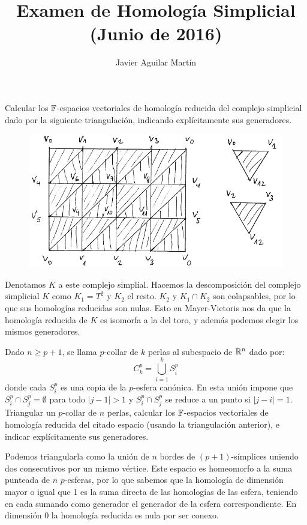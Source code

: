 \documentclass[twoside]{article}
\begin{document}
\title{Examen de Homología Simplicial (Junio de 2016)}
\author{Javier Aguilar Martín}
\maketitle

\begin{ejercicio}{1}
Calcular los $\mathbb{F}$-espacios vectoriales de homología reducida del complejo simplicial dado por la siguiente triangulación, indicando explícitamente sus generadores.
\begin{figure}[h!]
\centering
\includegraphics[scale=0.7]{Junio2016-1}
\end{figure}
\end{ejercicio}
\begin{solucion}
Denotamos $K$ a este complejo simplial. Hacemos la descomposición del complejo simplicial $K$ como $K_1=T^2$ y $K_2$ el resto. $K_2$ y $K_1\cap K_2$ son colapsables, por lo que sus homologías reducidas son nulas. Esto en Mayer-Vietoris nos da que la homología reducida de $K$ es isomorfa a la del toro, y además podemos elegir los mismos generadores.
\end{solucion}

\newpage

\begin{ejercicio}{2}
Dado $n\geq p+1$, se llama $p$-collar de $k$ perlas al subespacio de $\mathbb{R}^n$ dado por: 
\[
C_k^p=\bigcup_{i=1}^k S_i^p
\]
donde cada $S_i^p$ es una copia de la $p$-esfera canónica. En esta unión impone que $S_i^p\cap S_j^p=\emptyset$ para todo $|j-1|>1$ y $S_i^p\cap S_j^p$ se reduce a un punto si $|j-i|=1$. Triangular un $p$-collar de $n$ perlas, calcular los $\mathbb{F}$-espacios vectoriales de homología reducida del citado espacio (usando la triangulación anterior), e indicar explícitamente sus generadores.
\end{ejercicio}
\begin{solucion}
Podemos triangularla como la unión de $n$ bordes de $(p+1)$-símplices uniendo dos consecutivos por un mismo vértice. Este espacio es homeomorfo a la suma punteada de $n$ $p$-esferas, por lo que sabemos que la homología de dimensión mayor o igual que 1 es la suma directa de las homologías de las esfera, teniendo en cada sumando como generador el generador de la esfera correspondiente. En dimensión 0 la homología reducida es nula por ser conexo. 
\end{solucion}
\end{document}
